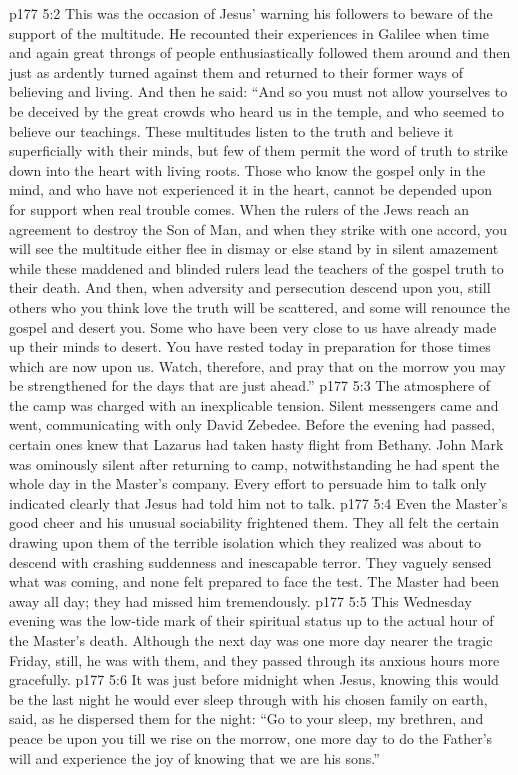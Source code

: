 \vs p177 5:2 This was the occasion of Jesus’ warning his followers to beware of the support of the multitude. He recounted their experiences in Galilee when time and again great throngs of people enthusiastically followed them around and then just as ardently turned against them and returned to their former ways of believing and living. And then he said: “And so you must not allow yourselves to be deceived by the great crowds who heard us in the temple, and who seemed to believe our teachings. These multitudes listen to the truth and believe it superficially with their minds, but few of them permit the word of truth to strike down into the heart with living roots. Those who know the gospel only in the mind, and who have not experienced it in the heart, cannot be depended upon for support when real trouble comes. When the rulers of the Jews reach an agreement to destroy the Son of Man, and when they strike with one accord, you will see the multitude either flee in dismay or else stand by in silent amazement while these maddened and blinded rulers lead the teachers of the gospel truth to their death. And then, when adversity and persecution descend upon you, still others who you think love the truth will be scattered, and some will renounce the gospel and desert you. Some who have been very close to us have already made up their minds to desert. You have rested today in preparation for those times which are now upon us. Watch, therefore, and pray that on the morrow you may be strengthened for the days that are just ahead.”\plusone
\vs p177 5:3 The atmosphere of the camp was charged with an inexplicable tension. Silent messengers came and went, communicating with only David Zebedee. Before the evening had passed, certain ones knew that Lazarus had taken hasty flight from Bethany. John Mark was ominously silent after returning to camp, notwithstanding he had spent the whole day in the Master’s company. Every effort to persuade him to talk only indicated clearly that Jesus had told him not to talk.
\vs p177 5:4 Even the Master’s good cheer and his unusual sociability frightened them. They all felt the certain drawing upon them of the terrible isolation which they realized was about to descend with crashing suddenness and inescapable terror. They vaguely sensed what was coming, and none felt prepared to face the test. The Master had been away all day; they had missed him tremendously.
\vs p177 5:5 This Wednesday evening was the low\hyp{}tide mark of their spiritual status up to the actual hour of the Master’s death. Although the next day was one more day nearer the tragic Friday, still, he was with them, and they passed through its anxious hours more gracefully.
\vs p177 5:6 It was just before midnight when Jesus, knowing this would be the last night he would ever sleep through with his chosen family on earth, said, as he dispersed them for the night: \textcolor{ubdarkred}{“Go to your sleep, my brethren, and peace be upon you till we rise on the morrow, one more day to do the Father’s will and experience the joy of knowing that we are his sons.”}
